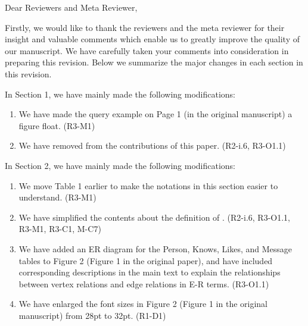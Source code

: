 \documentclass{article}
\begin{document}
Dear Reviewers and Meta Reviewer,
\bigskip %


Firstly, we would like to thank the reviewers and the meta reviewer for their insight and valuable comments which enable us to greatly improve the quality of our manuscript. We have carefully taken your comments into consideration in preparing this revision.
Below we summarize the major changes in each section in this revision.


In Section 1, we have mainly made the following modifications:
\begin{enumerate}
	\item We have made the query example on Page 1 (in the original manuscript) a figure float. (R3-M1)
	\item We have removed \rgmapping from the contributions of this paper. (R2-i.6, R3-O1.1)
\end{enumerate}

In Section 2, we have mainly made the following modifications:
\begin{enumerate}
	\item We move Table 1 earlier to make the notations in this section easier to understand. (R3-M1)
	\item We have simplified the contents about the definition of \rgmapping. (R2-i.6, R3-O1.1, R3-M1, R3-C1, M-C7)
	\item We have added an ER diagram for the Person, Knows, Likes, and Message tables to Figure 2 (Figure 1 in the original paper), and have included corresponding descriptions in the main text to explain the relationships between vertex relations and edge relations in E-R terms. (R3-O1.1)
	\item We have enlarged the font sizes in Figure 2 (Figure 1 in the original manuscript) from 28pt to 32pt. (R1-D1)
\end{enumerate}
\end{document}
